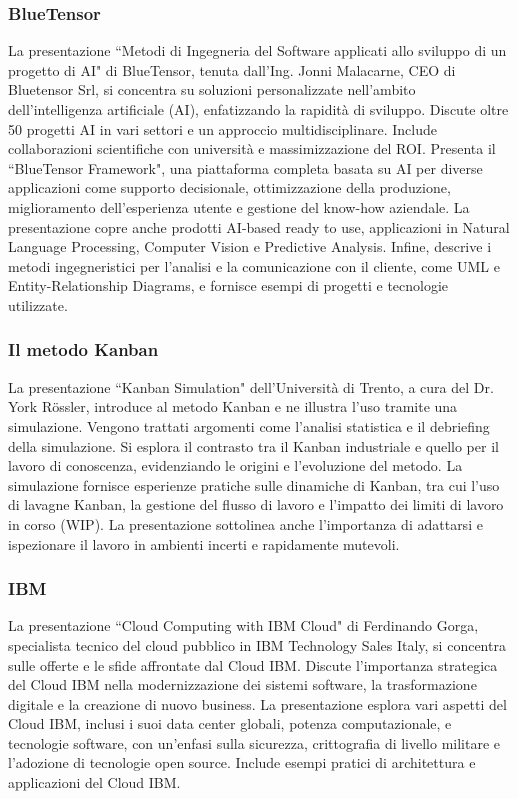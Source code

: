 \documentclass[11pt, a4paper]{article}
\theoremstyle{definition}
\begin{document}
\subsubsection{BlueTensor}
La presentazione ``Metodi di Ingegneria del Software applicati allo
sviluppo di un progetto di AI" di BlueTensor, tenuta dall'Ing.
Jonni Malacarne, CEO di Bluetensor Srl, si concentra su soluzioni
personalizzate nell'ambito dell'intelligenza artificiale (AI),
enfatizzando la rapidità di sviluppo. Discute oltre 50 progetti
AI in vari settori e un approccio multidisciplinare. Include
collaborazioni scientifiche con università e massimizzazione del
ROI. Presenta il ``BlueTensor Framework", una piattaforma completa
basata su AI per diverse applicazioni come supporto decisionale,
ottimizzazione della produzione, miglioramento dell'esperienza
utente e gestione del know-how aziendale. La presentazione copre
anche prodotti AI-based ready to use, applicazioni in Natural
Language Processing, Computer Vision e Predictive Analysis. Infine,
descrive i metodi ingegneristici per l'analisi e la comunicazione
con il cliente, come UML e Entity-Relationship Diagrams, e fornisce
esempi di progetti e tecnologie utilizzate.

\subsubsection{Il metodo Kanban}
La presentazione ``Kanban Simulation" dell'Università di Trento,
a cura del Dr. York Rössler, introduce al metodo Kanban e ne
illustra l'uso tramite una simulazione. Vengono trattati argomenti
come l'analisi statistica e il debriefing della simulazione. Si
esplora il contrasto tra il Kanban industriale e quello per il
lavoro di conoscenza, evidenziando le origini e l'evoluzione del
metodo. La simulazione fornisce esperienze pratiche sulle dinamiche
di Kanban, tra cui l'uso di lavagne Kanban, la gestione del flusso
di lavoro e l'impatto dei limiti di lavoro in corso (WIP).
La presentazione sottolinea anche l'importanza di adattarsi e
ispezionare il lavoro in ambienti incerti e rapidamente mutevoli.


\subsubsection{IBM}
La presentazione ``Cloud Computing with IBM Cloud" di Ferdinando Gorga,
specialista tecnico del cloud pubblico in IBM Technology Sales Italy,
si concentra sulle offerte e le sfide affrontate dal Cloud IBM. Discute
l'importanza strategica del Cloud IBM nella modernizzazione dei sistemi
software, la trasformazione digitale e la creazione di nuovo business.
La presentazione esplora vari aspetti del Cloud IBM, inclusi i suoi data
center globali, potenza computazionale, e tecnologie software, con
un'enfasi sulla sicurezza, crittografia di livello militare e l'adozione
di tecnologie open source. Include esempi pratici di architettura e
applicazioni del Cloud IBM.
\end{document}
